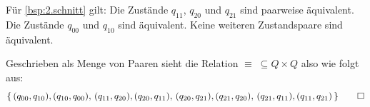 \begin{Bsp}
Für \autoref{bsp:2.schnitt} gilt: 
Die Zustände $q_{11}$, $q_{20}$ und $q_{21}$ sind paarweise äquivalent.
Die Zustände $q_{00}$ und $q_{10}$ sind äquivalent.
Keine weiteren Zustandspaare sind äquivalent.

Geschrieben als Menge von Paaren sieht die Relation $\equiv\;\subseteq Q\times Q$ also wie folgt aus:
\[
\{ \,
(q_{00}, q_{10}), (q_{10}, q_{00}), \,
(q_{11}, q_{20}), (q_{20}, q_{11}), \,
(q_{20}, q_{21}), (q_{21}, q_{20}), \,
(q_{21}, q_{11}), (q_{11}, q_{21}) \,
\}\qedhere
\]
\end{Bsp}

